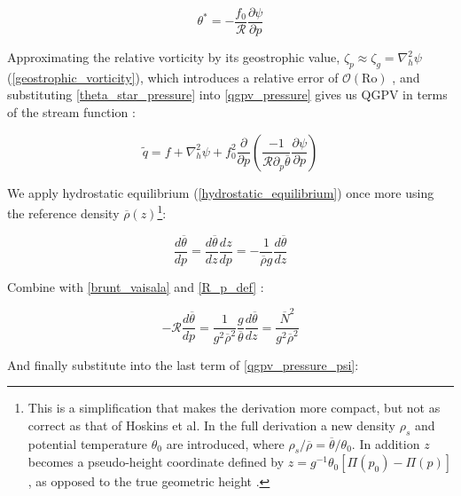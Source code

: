 \documentclass{article}
\begin{document}
\begin{equation}\label{theta_star_pressure}
    \theta^* = - \frac{f_0}{\mathcal{R}} \frac{\partial \psi}{\partial p}
\end{equation}

Approximating the relative vorticity by its geostrophic value, $\zeta_p \approx \zeta_g = \nabla_h^2 \psi$ (\cref{geostrophic_vorticity}), which introduces a relative error of $\mathcal{O}(\mathrm{Ro})$ \cite[p.~181]{HOLTON_chapter6}, and substituting \cref{theta_star_pressure} into \cref{qgpv_pressure} gives us QGPV in terms of the stream function \cite{Hoskins1985,HOLTON_chapter6}:

\begin{equation}\label{qgpv_pressure_psi}
    \tilde q = f + \nabla_h^2 \psi + f_0^2 \frac{\partial}{\partial p} \left( \frac{-1}{\mathcal{R} \partial_p \overline\theta} \frac{\partial \psi}{\partial p}\right)
\end{equation}

We apply hydrostatic equilibrium (\cref{hydrostatic_equilibrium}) once more using the reference density $\overline{\rho}(z)$\footnote{This is a simplification that makes the derivation more compact, but not as correct as that of Hoskins et al. In the full derivation a new density $\rho_s$ and potential temperature $\theta_0$ are introduced, where $\rho_s / \overline\rho = \overline\theta/\theta_0$. In addition $z$ becomes a pseudo-height coordinate defined by $z = g^{-1} \theta_0 \left[\Pi(p_0) - \Pi(p) \right]$, as opposed to the true geometric height \cite{Hoskins1985}.}:

\begin{equation}
    \frac{d \overline \theta}{dp} = \frac{d \overline{\theta}}{dz} \frac{d z}{d p} = - \frac{1}{\overline\rho g} \frac{d \overline{\theta}}{dz}
\end{equation}

Combine with \cref{brunt_vaisala} and \cref{R_p_def} \cite{Hoskins1985}:

\begin{equation}\label{minus_R_dtheta}
    - \mathcal{R}  \frac{d \overline \theta}{dp} = \frac{1}{g^2 \overline\rho^2} \frac{g}{\overline\theta} \frac{d \overline\theta}{dz} = \frac{\overline{N}^2}{g^2 \overline\rho^2}
\end{equation}

And finally substitute into the last term of \cref{qgpv_pressure_psi}:
\end{document}
